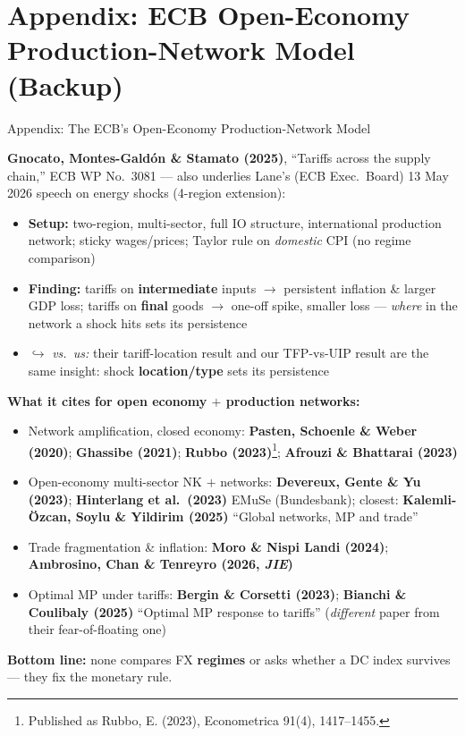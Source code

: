 \section*{Appendix: ECB Open-Economy Production-Network Model (Backup)}
\begin{frame}{Appendix: The ECB's Open-Economy Production-Network Model}
\hypertarget{ecbnetwork}{}

{\scriptsize \textbf{Gnocato, Montes-Gald\'on \& Stamato (2025)}, ``Tariffs across the supply chain,'' ECB WP No.\ 3081 --- also underlies Lane's (ECB Exec.\ Board) 13 May 2026 speech on energy shocks (4-region extension):}
{\scriptsize
\begin{itemize}\setlength{\itemsep}{1pt}\setlength{\topsep}{2pt}
\item \textbf{Setup:} two-region, multi-sector, full IO structure, international production network; sticky wages/prices; Taylor rule on \emph{domestic} CPI (no regime comparison)
\item \textbf{Finding:} tariffs on \textbf{intermediate} inputs $\to$ persistent inflation \& larger GDP loss; tariffs on \textbf{final} goods $\to$ one-off spike, smaller loss --- \emph{where} in the network a shock hits sets its persistence
\item \textcolor{customgreen!55!black}{$\hookrightarrow$ \emph{vs.\ us:}} their tariff-location result and our TFP-vs-UIP result are the same insight: shock \textbf{location/type} sets its persistence
\end{itemize}}

\vspace{2pt}
{\scriptsize \textbf{What it cites for open economy $+$ production networks:}}
{\tiny
\begin{itemize}\setlength{\itemsep}{1pt}\setlength{\topsep}{2pt}
\item Network amplification, closed economy: \textbf{Pasten, Schoenle \& Weber (2020)}; \textbf{Ghassibe (2021)}; \textbf{Rubbo (2023)}\footnote{\tiny Published as Rubbo, E. (2023), Econometrica 91(4), 1417--1455.}; \textbf{Afrouzi \& Bhattarai (2023)}
\item Open-economy multi-sector NK $+$ networks: \textbf{Devereux, Gente \& Yu (2023)}; \textbf{Hinterlang et al.\ (2023)} EMuSe (Bundesbank); closest: \textbf{Kalemli-\"Ozcan, Soylu \& Yildirim (2025)} ``Global networks, MP and trade''
\item Trade fragmentation \& inflation: \textbf{Moro \& Nispi Landi (2024)}; \textbf{Ambrosino, Chan \& Tenreyro (2026, \emph{JIE})}
\item Optimal MP under tariffs: \textbf{Bergin \& Corsetti (2023)}; \textbf{Bianchi \& Coulibaly (2025)} ``Optimal MP response to tariffs'' (\emph{different} paper from their fear-of-floating one)
\end{itemize}}

\vspace{2pt}
{\scriptsize \textbf{Bottom line:} none compares FX \textbf{regimes} or asks whether a DC index survives --- they fix the monetary rule.}

\end{frame}


